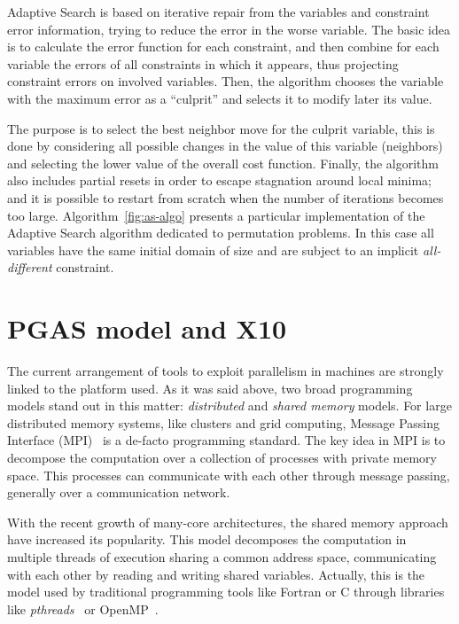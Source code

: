 \documentclass{llncs}
\begin{document}
Adaptive Search is based on iterative repair from the variables and
constraint error information, trying to reduce the error in the worse
variable. The basic idea is to calculate the error function for each
constraint, and then combine for each variable the errors of all
constraints in which it appears, thus projecting constraint errors on
involved variables. Then, the algorithm chooses the variable with the
maximum error as a ``culprit'' and selects it to modify later its
value.

The purpose is to select the best neighbor move for the culprit
variable, this is done by considering all possible changes in the value
of this variable (neighbors) and selecting the lower value of the
overall cost function. Finally, the algorithm also includes partial
resets in order to escape stagnation around local minima; and it is
possible to restart from scratch when the number of iterations becomes
too large.
Algorithm~\ref{fig:as-algo} presents a particular implementation of
the Adaptive Search algorithm dedicated to permutation problems. In
this case all  variables have the same initial domain of size  and
are subject to an implicit \emph{all-different} constraint.



\section{PGAS model and X10}
\label{sec:PGASX10}

The current arrangement of tools to exploit parallelism in machines
are strongly linked to the platform used. As it was said above, two
broad programming models stand out in this matter: \emph{distributed}
and \emph{shared memory} models. For large distributed memory systems,
like clusters and grid computing, Message Passing Interface
(MPI)~\cite{Snir1996} is a de-facto programming standard. The
key idea in MPI is to decompose the computation over a collection of
processes with private memory space. This processes can communicate
with each other through message passing, generally over a
communication network.

With the recent growth of many-core architectures, the shared memory
approach have increased its popularity. This model decomposes the
computation in multiple threads of execution sharing a common address
space, communicating with each other by reading and writing shared
variables. Actually, this is the model used by traditional programming
tools like Fortran or C through libraries like
\emph{pthreads}~\cite{Butenhof1997} or OpenMP~\cite{OpenMP}.
\end{document}
